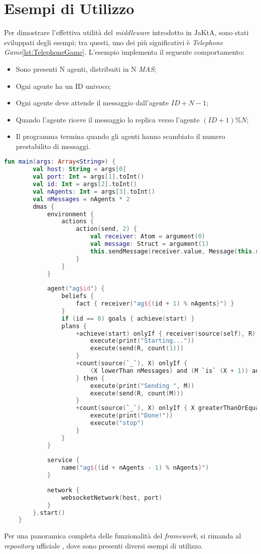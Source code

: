 \section{Esempi di Utilizzo}

Per dimostrare l'effettiva utilità del \textit{middleware} introdotto in JaKtA, sono stati sviluppati degli esempi; tra questi, uno dei più significativi è \textit{Telephone Game}\ref{lst:TelephoneGame}. L'esempio implementa il seguente comportamento:

\begin{itemize}
    \item Sono presenti N agenti, distribuiti in N \textit{MAS};
    \item Ogni agente ha un ID univoco;
    \item Ogni agente deve attende il messaggio dall'agente \(ID + N - 1\);
    \item Quando l'agente riceve il messaggio lo replica verso l'agente \((ID + 1) \% N\);
    \item Il programma termina quando gli agenti hanno scambiato il numero prestabilito di messaggi.
\end{itemize}

\begin{lstlisting}[caption={Esempio di utilizzo \texttt{TelephoneGame}.}, label={lst:TelephoneGame}, language=Kotlin]
    fun main(args: Array<String>) {
        val host: String = args[0]
        val port: Int = args[1].toInt()
        val id: Int = args[2].toInt()
        val nAgents: Int = args[3].toInt()
        val nMessages = nAgents * 2
        dmas {
            environment {
                actions {
                    action(send, 2) {
                        val receiver: Atom = argument(0)
                        val message: Struct = argument(1)
                        this.sendMessage(receiver.value, Message(this.sender, Tell, message))
                    }
                }
            }
    
            agent("ag$id") {
                beliefs {
                    fact { receiver("ag${(id + 1) % nAgents}") }
                }
                if (id == 0) goals { achieve(start) }
                plans {
                    +achieve(start) onlyIf { receiver(source(self), R) } then {
                        execute(print("Starting..."))
                        execute(send(R, count(1)))
                    }
                    +count(source(`_`), X) onlyIf {
                        (X lowerThan nMessages) and (M `is` (X + 1)) and receiver(source(self), R)
                    } then {
                        execute(print("Sending ", M))
                        execute(send(R, count(M)))
                    }
                    +count(source(`_`), X) onlyIf { X greaterThanOrEqualsTo nMessages } then {
                        execute(print("Done!"))
                        execute("stop")
                    }
                }
            }
    
            service {
                name("ag${(id + nAgents - 1) % nAgents}")
            }
    
            network {
                websocketNetwork(host, port)
            }
        }.start()
    }
\end{lstlisting}

Per una panoramica completa delle funzionalità del \textit{framework}, si rimanda al \textit{repository} ufficiale \cite{repo}, dove sono presenti diversi esempi di utilizzo.